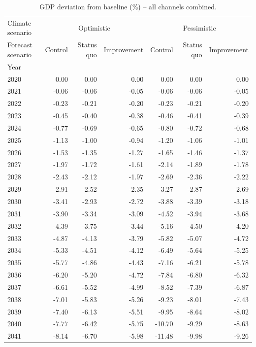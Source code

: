 \begin{table}
\caption{GDP deviation from baseline (\%) -- all channels combined.}
\label{tab:results_All_baseline_rel}
\centering
\begin{tabular}{lrrrrrr}
\toprule
Climate scenario & \multicolumn{3}{c}{Optimistic} & \multicolumn{3}{c}{Pessimistic} \\
Forecast scenario & Control & Status quo & Improvement & Control & Status quo & Improvement \\
Year &  &  &  &  &  &  \\
\midrule
2020 & 0.00 & 0.00 & 0.00 & 0.00 & 0.00 & 0.00 \\
2021 & -0.06 & -0.06 & -0.05 & -0.06 & -0.06 & -0.05 \\
2022 & -0.23 & -0.21 & -0.20 & -0.23 & -0.21 & -0.20 \\
2023 & -0.45 & -0.40 & -0.38 & -0.46 & -0.41 & -0.39 \\
2024 & -0.77 & -0.69 & -0.65 & -0.80 & -0.72 & -0.68 \\
2025 & -1.13 & -1.00 & -0.94 & -1.20 & -1.06 & -1.01 \\
2026 & -1.53 & -1.35 & -1.27 & -1.65 & -1.46 & -1.37 \\
2027 & -1.97 & -1.72 & -1.61 & -2.14 & -1.89 & -1.78 \\
2028 & -2.43 & -2.12 & -1.97 & -2.69 & -2.36 & -2.22 \\
2029 & -2.91 & -2.52 & -2.35 & -3.27 & -2.87 & -2.69 \\
2030 & -3.41 & -2.93 & -2.72 & -3.88 & -3.39 & -3.18 \\
2031 & -3.90 & -3.34 & -3.09 & -4.52 & -3.94 & -3.68 \\
2032 & -4.39 & -3.75 & -3.44 & -5.16 & -4.50 & -4.20 \\
2033 & -4.87 & -4.13 & -3.79 & -5.82 & -5.07 & -4.72 \\
2034 & -5.33 & -4.51 & -4.12 & -6.49 & -5.64 & -5.25 \\
2035 & -5.77 & -4.86 & -4.43 & -7.16 & -6.21 & -5.78 \\
2036 & -6.20 & -5.20 & -4.72 & -7.84 & -6.80 & -6.32 \\
2037 & -6.61 & -5.52 & -4.99 & -8.52 & -7.39 & -6.87 \\
2038 & -7.01 & -5.83 & -5.26 & -9.23 & -8.01 & -7.43 \\
2039 & -7.40 & -6.13 & -5.51 & -9.95 & -8.64 & -8.02 \\
2040 & -7.77 & -6.42 & -5.75 & -10.70 & -9.29 & -8.63 \\
2041 & -8.14 & -6.70 & -5.98 & -11.48 & -9.98 & -9.26 \\

\end{tabular}
\end{table}
